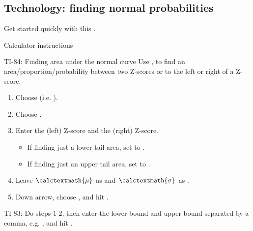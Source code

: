 \subsection{Technology: finding normal probabilities}
\label{normal}

\noindent Get started quickly with this .

\begin{center}
\end{center}

\B{\newpage}
\noindent Calculator instructions

\begin{onebox}{ TI-84: Finding area under the normal curve}
Use  ,  to find an area/proportion/probability between two Z-scores or to the left or right of a Z-score.\vspace{-1mm}
\begin{enumerate}
\setlength{\itemsep}{0mm}
\item Choose   (i.e. ).
\item Choose .
\item Enter the  (left) Z-score and the  (right) Z-score.
\vspace{-1.5mm}
  \begin{itemize}
  \setlength{\itemsep}{0mm}
  \item If finding just a lower tail area, set  to .
  \item If finding just an upper tail area, set  to .
\end{itemize}
\item Leave $\calctextmath{\mu}$ as  and $\calctextmath{\sigma}$ as .
\item Down arrow, choose , and hit .\vspace{-1.5mm}
\end{enumerate}
TI-83: Do steps 1-2, then enter the lower bound and upper bound separated by a comma, e.g. , and hit .\end{onebox}

